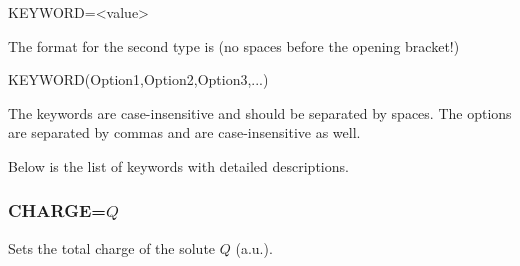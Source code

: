 \documentclass[oneside,11pt,openany]{book}
\newcommand{\tw}{\ttfamily}
\begin{document}
\begin{description}
\item {\tw KEYWORD=<value>}
\end{description}

\noindent The format for the second type is (no spaces before
the opening bracket!)

\begin{description}
\item {\tw KEYWORD(Option1,Option2,Option3,...)}
\end{description}

\noindent The keywords are case-insensitive and should be separated
by spaces. The options are separated by commas and are case-insensitive
as well.

Below is the list of keywords with detailed descriptions.

\subsubsection*{CHARGE=$Q$}
%
Sets the total charge of the solute $Q$ (a.u.).
\end{document}
